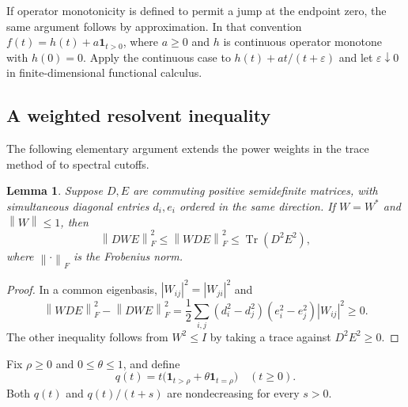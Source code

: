 \documentclass[11pt]{article}
\newtheorem{lemma}{Lemma}
\newcommand{\Tr}{\operatorname{Tr}}
\newcommand{\nn}[1]{\left\lVert#1\right\rVert}
\begin{document}
If operator monotonicity is defined to permit a jump at the endpoint
zero, the same argument follows by approximation. In that convention
$f(t)=h(t)+a\mathbf1_{t>0}$, where $a\geq0$ and $h$ is continuous
operator monotone with $h(0)=0$. Apply the continuous case to
$h(t)+at/(t+\varepsilon)$ and let $\varepsilon\downarrow0$ in
finite-dimensional functional calculus.

\subsection*{A weighted resolvent inequality}
The following elementary argument extends the power weights in the
trace method of \cite{DDFL} to spectral cutoffs.

\begin{lemma}\label{frob}
Suppose $D,E$ are commuting positive semidefinite matrices, with
simultaneous diagonal entries $d_i,e_i$ ordered in the same direction.
If $W=W^*$ and $\nn{W}\leq1$, then
\[
 \nn{DWE}_F^2\leq\nn{WDE}_F^2\leq\Tr(D^2E^2),
\]
where $\nn{\cdot}_F$ is the Frobenius norm.
\end{lemma}
\begin{proof}
In a common eigenbasis, $|W_{ij}|^2=|W_{ji}|^2$ and
\[
 \nn{WDE}_F^2-\nn{DWE}_F^2
 =\frac12\sum_{i,j}(d_i^2-d_j^2)(e_i^2-e_j^2)|W_{ij}|^2\geq0.
\]
The other inequality follows from $W^2\leq I$ by taking a trace
against $D^2E^2\geq0$.
\end{proof}

Fix $\rho\geq0$ and $0\leq\theta\leq1$, and define
\begin{equation}\label{cut}
 q(t)=t\bigl(\mathbf1_{t>\rho}+\theta\mathbf1_{t=\rho}\bigr)
 \quad(t\geq0).
\end{equation}
Both $q(t)$ and $q(t)/(t+s)$ are nondecreasing for every $s>0$.
\end{document}
